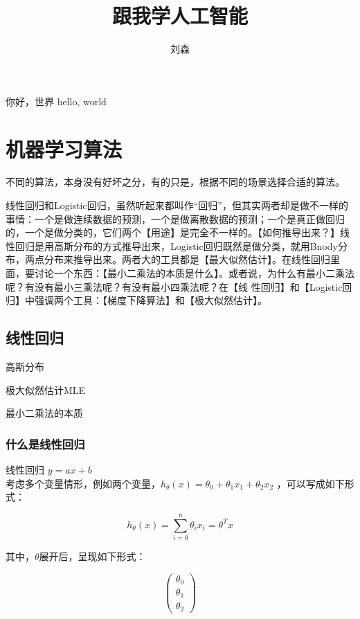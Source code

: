 \documentclass[UTF8]{ctexart}
\author{刘森}
\title{跟我学人工智能}
\begin{document}
    \maketitle
你好，世界 hello, world %



\section{机器学习算法}

不同的算法，本身没有好坏之分，有的只是，根据不同的场景选择合适的算法。

线性回归和Logistic回归，虽然听起来都叫作“回归”，但其实两者却是做不一样的事情：一个是做连续数据的预测，一个是做离散数据的预测；一个是真正做回归的，一个是做分类的，它们两个【用途】是完全不一样的。【如何推导出来？】线性回归是用高斯分布的方式推导出来，Logistic回归既然是做分类，就用Bnody分布，两点分布来推导出来。两者大的工具都是【最大似然估计】。在线性回归里面，要讨论一个东西：【最小二乘法的本质是什么】。或者说，为什么有最小二乘法呢？有没有最小三乘法呢？有没有最小四乘法呢？在【线 性回归】和【Logistic回归】中强调两个工具：【梯度下降算法】和【极大似然估计】。

\subsection{线性回归}
高斯分布

极大似然估计MLE

最小二乘法的本质

\subsubsection{什么是线性回归}
线性回归
$y=ax+b$\\

考虑多个变量情形，例如两个变量，$h_{\theta}(x)=\theta_{0}+\theta_{1}x_{1}+\theta_{2}x_{2}$ ，可以写成如下形式：

\begin{displaymath}
h_{\theta}(x)=\sum_{i=0}^{n}\theta_{i}x_{i}=\theta^{T}x
\end{displaymath}

其中，$\theta$展开后，呈现如下形式：

\[ \left( \begin{array}{c}
\theta_{0} \\
\theta_{1} \\
\theta_{2} \end{array} \right)\]
\end{document}
